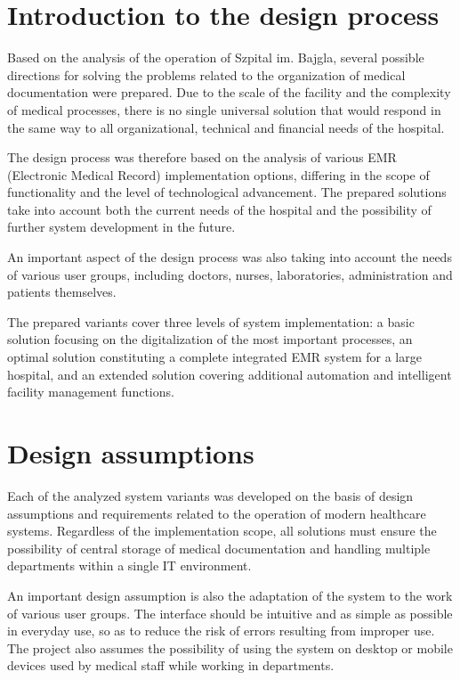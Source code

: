 \label{chapter:project-idea}

\setlength{\parskip}{0pt}
\setlength{\parindent}{1.25cm}

\section{Introduction to the design process}
Based on the analysis of the operation of Szpital im. Bajgla, several possible directions for solving the problems related to the organization of medical documentation were prepared. Due to the scale of the facility and the complexity of medical processes, there is no single universal solution that would respond in the same way to all organizational, technical and financial needs of the hospital.

The design process was therefore based on the analysis of various EMR (Electronic Medical Record) implementation options, differing in the scope of functionality and the level of technological advancement. The prepared solutions take into account both the current needs of the hospital and the possibility of further system development in the future.

An important aspect of the design process was also taking into account the needs of various user groups, including doctors, nurses, laboratories, administration and patients themselves.

The prepared variants cover three levels of system implementation: a basic solution focusing on the digitalization of the most important processes, an optimal solution constituting a complete integrated EMR system for a large hospital, and an extended solution covering additional automation and intelligent facility management functions.


\section{Design assumptions}
Each of the analyzed system variants was developed on the basis of design assumptions and requirements related to the operation of modern healthcare systems. Regardless of the implementation scope, all solutions must ensure the possibility of central storage of medical documentation and handling multiple departments within a single IT environment.

An important design assumption is also the adaptation of the system to the work of various user groups. The interface should be intuitive and as simple as possible in everyday use, so as to reduce the risk of errors resulting from improper use. The project also assumes the possibility of using the system on desktop or mobile devices used by medical staff while working in departments.

